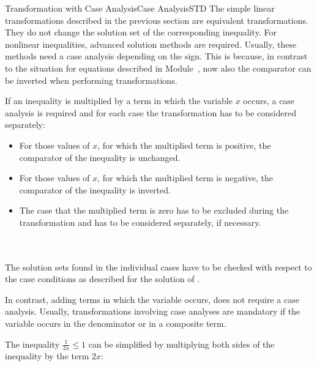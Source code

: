 \begin{MXContent}{Transformation with Case Analysis}{Case Analysis}{STD}
The simple linear transformations described in the previous section are equivalent transformations.
They do not change the solution set of the corresponding inequality. For nonlinear
inequalities, advanced solution methods are required. Usually, these methods need 
a case analysis depending on the sign. This is because, in contrast to the situation for
equations described in Module~, now also the comparator can be inverted when
performing transformations.

 
\begin{MInfo}
If an inequality is multiplied by a term in which the variable $x$ occurs, a case analysis 
is required and for each case the transformation has to be considered separately: 

\begin{itemize}
\item{For those values of $x$, for which the multiplied term is positive, the comparator
of the inequality is unchanged.}
\item{For those values of $x$, for which the multiplied term is negative, the comparator
of the inequality is inverted.}
\item{The case that the multiplied term is zero has to be excluded during the transformation and
has to be considered separately, if necessary.}
\end{itemize}
\ \\ \ \\
The solution sets found in the individual cases have to be checked with respect to the case conditions
as described for the solution of .
\end{MInfo}

In contrast, adding terms in which the variable occurs, does not require a case analysis. Usually, 
transformations involving case analyses are mandatory if the variable occurs in the denominator or 
in a composite term.


\begin{MExample}
The inequality $\frac1{2x}\leq 1$ can be simplified by multiplying both sides of the inequality
by the term $2x$:


\end{MExample}
\end{MXContent}
